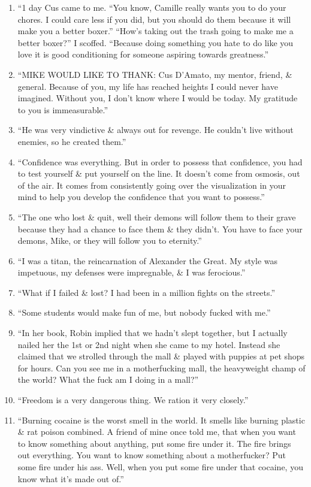 \documentclass{article}
\numberwithin{equation}{section}
\begin{document}
\begin{enumerate}
	\item ``1 day Cus came to me. ``You know, Camille really wants you to do your chores. I could care less if you did, but you should do them because it will make you a better boxer.'' ``How's taking out the trash going to make me a better boxer?'' I scoffed. ``Because doing something you hate to do like you love it is good conditioning for someone aspiring towards greatness.''
	\item ``MIKE WOULD LIKE TO THANK: Cus D'Amato, my mentor, friend, \& general. Because of you, my life has reached heights I could never have imagined. Without you, I don't know where I would be today. My gratitude to you is immeasurable.''
	\item ``He was very vindictive \& always out for revenge. He couldn't live without enemies, so he created them.''
	\item ``Confidence was everything. But in order to possess that confidence, you had to test yourself \& put yourself on the line. It doesn't come from osmosis, out of the air. It comes from consistently going over the visualization in your mind to help you develop the confidence that you want to possess.''
	\item ``The one who lost \& quit, well their demons will follow them to their grave because they had a chance to face them \& they didn't. You have to face your demons, Mike, or they will follow you to eternity.''
	\item ``I was a titan, the reincarnation of Alexander the Great. My style was impetuous, my defenses were impregnable, \& I was ferocious.''
	\item ``What if I failed \& lost? I had been in a million fights on the streets.''
	\item ``Some students would make fun of me, but nobody fucked with me.''
	\item ``In her book, Robin implied that we hadn't slept together, but I actually nailed her the 1st or 2nd night when she came to my hotel. Instead she claimed that we strolled through the mall \& played with puppies at pet shops for hours. Can you see me in a motherfucking mall, the heavyweight champ of the world? What the fuck am I doing in a mall?''
	\item ``Freedom is a very dangerous thing. We ration it very closely.''
	\item ``Burning cocaine is the worst smell in the world. It smells like burning plastic \& rat poison combined. A friend of mine once told me, that when you want to know something about anything, put some fire under it. The fire brings out everything. You want to know something about a motherfucker? Put some fire under his ass. Well, when you put some fire under that cocaine, you know what it's made out of.''

\end{enumerate}
\end{document}
